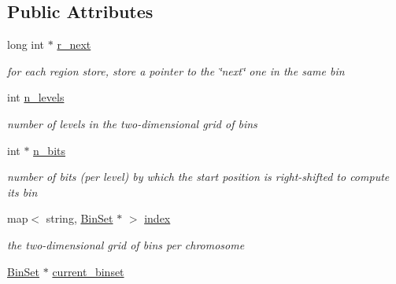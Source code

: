 \subsection*{Public Attributes}
\begin{DoxyCompactItemize}
\item 
\hypertarget{classUnsortedGenomicRegionSetOverlaps_a251e09b7f0a13a56b902c30791228ce4}{
long int $\ast$ \hyperlink{classUnsortedGenomicRegionSetOverlaps_a251e09b7f0a13a56b902c30791228ce4}{r\_\-next}}
\label{classUnsortedGenomicRegionSetOverlaps_a251e09b7f0a13a56b902c30791228ce4}

\begin{DoxyCompactList}\small\item\em for each region store, store a pointer to the \char`\"{}next\char`\"{} one in the same bin \end{DoxyCompactList}\item 
\hypertarget{classUnsortedGenomicRegionSetOverlaps_a1cc721de471ed40dcc7d8eae258e5833}{
int \hyperlink{classUnsortedGenomicRegionSetOverlaps_a1cc721de471ed40dcc7d8eae258e5833}{n\_\-levels}}
\label{classUnsortedGenomicRegionSetOverlaps_a1cc721de471ed40dcc7d8eae258e5833}

\begin{DoxyCompactList}\small\item\em number of levels in the two-\/dimensional grid of bins \end{DoxyCompactList}\item 
\hypertarget{classUnsortedGenomicRegionSetOverlaps_a76ecebfcf839a940bdae26069ceef748}{
int $\ast$ \hyperlink{classUnsortedGenomicRegionSetOverlaps_a76ecebfcf839a940bdae26069ceef748}{n\_\-bits}}
\label{classUnsortedGenomicRegionSetOverlaps_a76ecebfcf839a940bdae26069ceef748}

\begin{DoxyCompactList}\small\item\em number of bits (per level) by which the start position is right-\/shifted to compute its bin \end{DoxyCompactList}\item 
\hypertarget{classUnsortedGenomicRegionSetOverlaps_abeeb94562abdf4aebc36684959a5bc78}{
map$<$ string, \hyperlink{classUnsortedGenomicRegionSetOverlaps_a0f0857dd93ad3c047d1f5056a57edc14}{BinSet} $\ast$ $>$ \hyperlink{classUnsortedGenomicRegionSetOverlaps_abeeb94562abdf4aebc36684959a5bc78}{index}}
\label{classUnsortedGenomicRegionSetOverlaps_abeeb94562abdf4aebc36684959a5bc78}

\begin{DoxyCompactList}\small\item\em the two-\/dimensional grid of bins per chromosome \end{DoxyCompactList}\item 
\hypertarget{classUnsortedGenomicRegionSetOverlaps_a6bbb87f3c66d04527f06a5761df1ab56}{
\hyperlink{classUnsortedGenomicRegionSetOverlaps_a0f0857dd93ad3c047d1f5056a57edc14}{BinSet} $\ast$ \hyperlink{classUnsortedGenomicRegionSetOverlaps_a6bbb87f3c66d04527f06a5761df1ab56}{current\_\-binset}}
\label{classUnsortedGenomicRegionSetOverlaps_a6bbb87f3c66d04527f06a5761df1ab56}


\end{DoxyCompactItemize}

